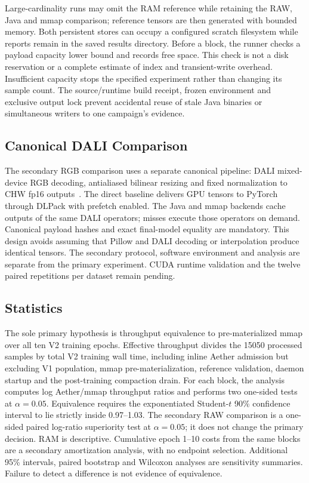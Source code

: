 \documentclass[journal]{IEEEtran}
\begin{document}
Large-cardinality runs may omit the RAM reference while retaining the RAW, Java and mmap comparison; reference tensors are then generated with bounded memory. Both persistent stores can occupy a configured scratch filesystem while reports remain in the saved results directory. Before a block, the runner checks a payload capacity lower bound and records free space. This check is not a disk reservation or a complete estimate of index and transient-write overhead. Insufficient capacity stops the specified experiment rather than changing its sample count. The source/runtime build receipt, frozen environment and exclusive output lock prevent accidental reuse of stale Java binaries or simultaneous writers to one campaign's evidence.

\subsection{Canonical DALI Comparison}
The secondary RGB comparison uses a separate canonical pipeline: DALI mixed-device RGB decoding, antialiased bilinear resizing and fixed normalization to CHW fp16 outputs~\cite{dali}. The direct baseline delivers GPU tensors to PyTorch through DLPack with prefetch enabled. The Java and mmap backends cache outputs of the same DALI operators; misses execute those operators on demand. Canonical payload hashes and exact final-model equality are mandatory. This design avoids assuming that Pillow and DALI decoding or interpolation produce identical tensors. The secondary protocol, software environment and analysis are separate from the primary experiment. CUDA runtime validation and the twelve paired repetitions per dataset remain pending.

\subsection{Statistics}
The sole primary hypothesis is throughput equivalence to pre-materialized mmap over all ten V2 training epochs. Effective throughput divides the 15050 processed samples by total V2 training wall time, including inline Aether admission but excluding V1 population, mmap pre-materialization, reference validation, daemon startup and the post-training compaction drain. For each block, the analysis computes log Aether/mmap throughput ratios and performs two one-sided tests at $\alpha=0.05$. Equivalence requires the exponentiated Student-$t$ 90\% confidence interval to lie strictly inside 0.97--1.03. The secondary RAW comparison is a one-sided paired log-ratio superiority test at $\alpha=0.05$; it does not change the primary decision. RAM is descriptive. Cumulative epoch 1--10 costs from the same blocks are a secondary amortization analysis, with no endpoint selection. Additional 95\% intervals, paired bootstrap and Wilcoxon analyses are sensitivity summaries. Failure to detect a difference is not evidence of equivalence.
\end{document}
